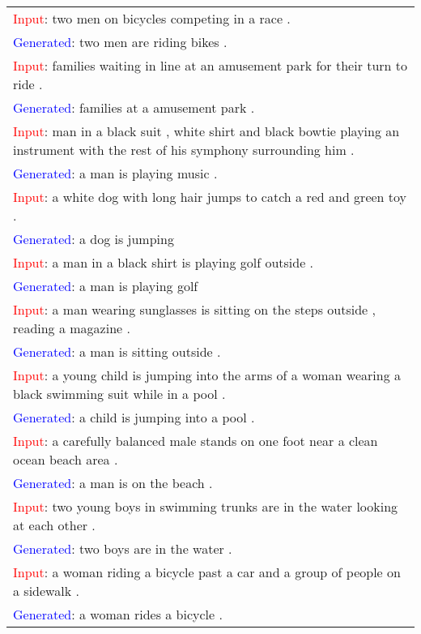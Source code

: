 
\begin{table*}
\centering
\small
\begin{tabular}{p{}}
\toprule
\textcolor{red}{Input}: two men on bicycles competing in a race . \\
\textcolor{blue}{Generated}: two men are riding bikes . \\
\midrule
\textcolor{red}{Input}: families waiting in line at an amusement park for their turn to ride . \\
\textcolor{blue}{Generated}: families at a amusement park . \\
\midrule
\textcolor{red}{Input}: man in a black suit , white shirt and black bowtie playing an instrument with the rest of his symphony surrounding him . \\
\textcolor{blue}{Generated}: a man is playing music . \\
\midrule
\textcolor{red}{Input}: a white dog with long hair jumps to catch a red and green toy . \\
\textcolor{blue}{Generated}: a dog is jumping \\
\midrule
\textcolor{red}{Input}: a man in a black shirt is playing golf outside . \\
\textcolor{blue}{Generated}: a man is playing golf \\
\midrule
\textcolor{red}{Input}: a man wearing sunglasses is sitting on the steps outside , reading a magazine . \\
\textcolor{blue}{Generated}: a man is sitting outside . \\
\midrule
\textcolor{red}{Input}: a young child is jumping into the arms of a woman wearing a black swimming suit while in a pool . \\
\textcolor{blue}{Generated}: a child is jumping into a pool . \\
\midrule
\textcolor{red}{Input}: a carefully balanced male stands on one foot near a clean ocean beach area . \\
\textcolor{blue}{Generated}: a man is on the beach . \\
\midrule
\textcolor{red}{Input}: two young boys in swimming trunks are in the water looking at each other . \\
\textcolor{blue}{Generated}: two boys are in the water . \\
\midrule
\textcolor{red}{Input}: a woman riding a bicycle past a car and a group of people on a sidewalk . \\
\textcolor{blue}{Generated}: a woman rides a bicycle . \\

\end{tabular}
\end{table*}
